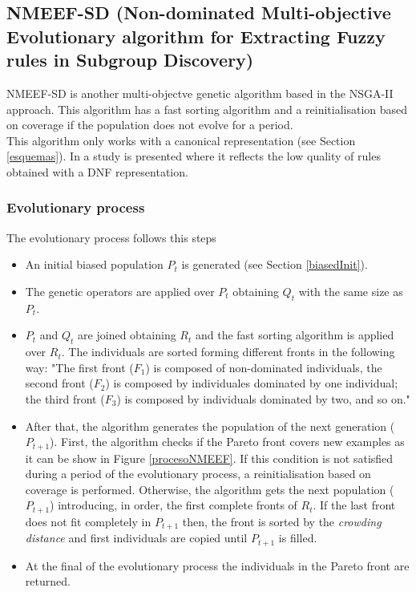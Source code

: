 \documentclass[]{article}
\begin{document}
\subsection{NMEEF-SD (Non-dominated Multi-objective Evolutionary
algorithm for Extracting Fuzzy rules in Subgroup
Discovery)}\label{nmeef-sd-non-dominated-multi-objective-evolutionary-algorithm-for-extracting-fuzzy-rules-in-subgroup-discovery}

NMEEF-SD is another multi-objectve genetic algorithm based in the
NSGA-II \cite{nsga} approach. This algorithm has a fast sorting
algorithm and a reinitialisation based on coverage if the population
does not evolve for a period.\\This algorithm only works with a
canonical representation (see Section \ref{esquemas}). In
\cite{estudioNMEEF} a study is presented where it reflects the low
quality of rules obtained with a DNF representation.

\subsubsection{Evolutionary process}\label{evolutionary-process}

The evolutionary process follows this steps

\begin{itemize}
  \item An initial biased population $P_t$ is generated (see Section \ref{biasedInit}).
  \item The genetic operators are applied over $P_t$ obtaining $Q_t$ with the same size as $P_t$.
  \item $P_t$ and $Q_t$ are joined obtaining $R_t$ and the fast sorting algorithm is applied over $R_t$. The individuals are sorted forming different fronts in the following way: "The first front ($F_1$) is composed of non-dominated individuals, the second front ($F_2$) is composed by individuales dominated by one individual; the third front ($F_3$) is composed by individuals dominated by two, and so on."
  \item After that, the algorithm generates the population of the next generation ($P_{t+1}$). First, the algorithm checks if the Pareto front covers new examples as it can be show in Figure \ref{procesoNMEEF}. If this condition is not satisfied during a period of the evolutionary process, a reinitialisation based on coverage is performed. Otherwise, the algorithm gets the next population ($P_{t+1}$) introducing, in order, the first complete fronts of $R_t$. If the last front does not fit completely in $P_{t+1}$ then, the front is sorted by the \textit{crowding distance} and first individuals are copied until $P_{t+1}$ is filled.
  \item At the final of the evolutionary process the individuals in the Pareto front are returned.
\end{itemize}
\end{document}
